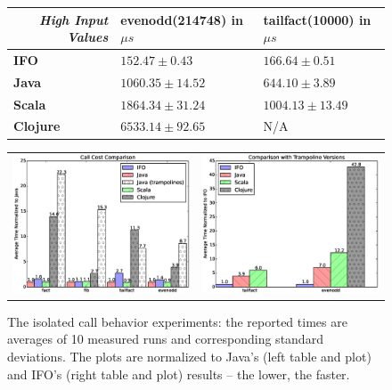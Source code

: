 \begin{figure}[h!t]
\begin{center}
\begin{tabular}{|l|l|l|}
\hline
\multicolumn{1}{|r|}{\textit{\textbf{High Input Values}}}  & evenodd(214748) in $\mu s$ & tailfact(10000) in $\mu s$ \\ \hline
\textbf{IFO}                                                                                               & $152.47 \pm 0.43$     & $166.64 \pm 0.51$    \\ \hline
\textbf{Java}                                                                                              & $1060.35 \pm 14.52$ & $644.10 \pm 3.89$   \\ \hline
\textbf{Scala}                                                                                              & $1864.34 \pm 31.24$  & $1004.13 \pm 13.49$ \\ \hline
\textbf{Clojure}                                                                                           & $6533.14 \pm 92.65$ & N/A                       \\ \hline
\end{tabular}
  \begin{tabular}{ll}
  \begin{minipage}{6.2cm}{\includegraphics[width=6.2cm]{./src/img/low.eps}}\end{minipage} &
\begin{minipage}{6.2cm}{\includegraphics[width=6.2cm]{./src/img/high.eps}}\end{minipage}
\end{tabular}

\end{center}
\vspace{-20pt}
  \caption{The isolated call behavior experiments: the reported times are averages of 10 measured runs and corresponding standard deviations. The plots are normalized to Java's (left table and plot) and IFO's (right table and plot) results -- the lower, the faster.}

\label{fig:micro}
\end{figure}
